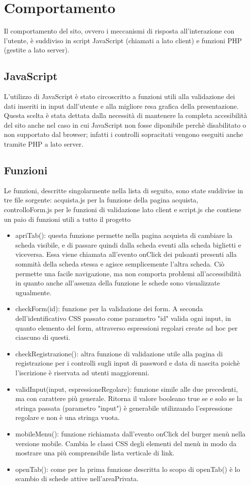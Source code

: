 \section{Comportamento}
Il comportamento del sito, ovvero i meccanismi di risposta all'interazione con l'utente, è suddiviso in script JavaScript (chiamati a lato client) e funzioni PHP (gestite a lato server).
\subsection{JavaScript}
L'utilizzo di JavaScript è stato circoscritto a funzioni utili alla validazione dei dati inseriti in input dall'utente e alla migliore resa grafica della presentazione.
Questa scelta è stata dettata dalla necessità di mantenere la completa accesibilità del sito anche nel caso in cui JavaScript non fosse diponibile perchè disabilitato o non supportato dal browser; infatti i controlli sopracitati vengono eseguiti anche tramite PHP a lato server.
\subsection{Funzioni}
Le funzioni, descritte singolarmente nella lista di seguito, sono state suddivise in tre file sorgente: acquista.js per la funzione della pagina acquista, controlloForm.js per le funzioni di validazione lato client e script.js che contiene un paio di funzioni utili a tutto il progetto
\begin{itemize}
\item apriTab(): questa funzione permette nella pagina acquista di cambiare la scheda visibile, e di passare quindi dalla scheda eventi alla scheda biglietti e viceversa. Essa viene chiamata all'evento onClick dei pulsanti presenti alla sommità della scheda stessa e agisce semplicemente l'altra scheda. Ciò permette una facile navigazione, ma non comporta problemi all'accessibilità in quanto anche all'assenza della funzione le schede sono visualizzate ugualmente.
\item checkForm(id): funzione per la validazione dei form. A seconda dell'identificativo CSS passato come parametro "id" valida ogni input, in quanto elemento del form, attraverso espressioni regolari create ad hoc per ciascuno di questi.
\item checkRegistrazione(): altra funzione di validazione utile alla pagina di registrazione per i controlli sugli input di password e data di nascita poichè l'iscrizione è riservata ad utenti maggiorenni.
\item validInput(input, espressioneRegolare): funzione simile alle due precedenti, ma con carattere più generale. Ritorna il valore booleano true se e solo se la stringa passata (parametro "input") è generabile utilizzando l'espressione regolare e non è una stringa vuota.
\item mobileMenu(): funzione richiamata dall'evento onClick del burger menù nella versione mobile. Cambia le classi CSS degli elementi del menù in modo da mostrare una più comprensibile lista verticale di link.
\item openTab(): come per la prima funzione descritta lo scopo di openTab() è lo scambio di schede attive nell'areaPrivata.
\end{itemize}
